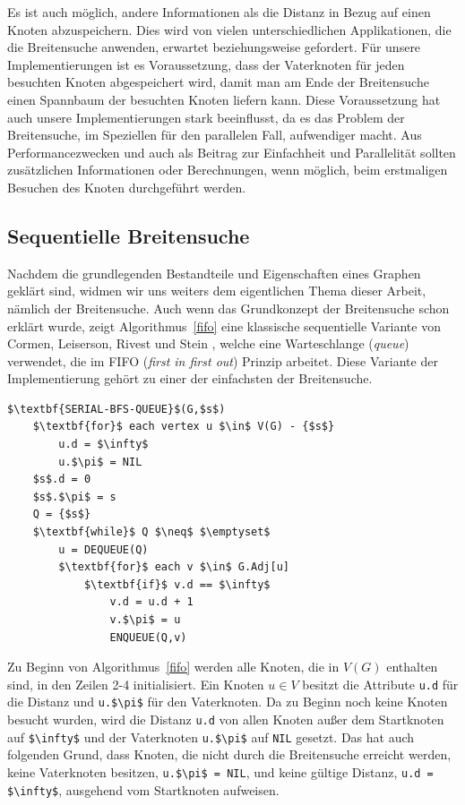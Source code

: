 \documentclass[11pt,a4paper]{article}
\begin{document}
Es ist auch möglich, andere Informationen als die Distanz in Bezug auf einen Knoten abzuspeichern. Dies wird von vielen unterschiedlichen Applikationen, die die Breitensuche anwenden, erwartet beziehungsweise gefordert. Für unsere Implementierungen ist es Voraussetzung, dass der Vaterknoten für jeden besuchten Knoten abgespeichert wird, damit man am Ende der Breitensuche einen Spannbaum der besuchten Knoten liefern kann. Diese Voraussetzung hat auch unsere Implementierungen stark beeinflusst, da es das Problem der Breitensuche, im Speziellen für den parallelen Fall, aufwendiger macht. Aus Performancezwecken und auch als Beitrag zur Einfachheit und Parallelität sollten zusätzlichen Informationen oder Berechnungen, wenn möglich, beim erstmaligen Besuchen des Knoten durchgeführt werden.
\subsection{Sequentielle Breitensuche}
Nachdem die grundlegenden Bestandteile und Eigenschaften eines Graphen geklärt sind, widmen wir uns weiters dem eigentlichen Thema dieser Arbeit, nämlich der Breitensuche. Auch wenn das Grundkonzept der Breitensuche schon erklärt wurde, zeigt Algorithmus~\ref{fifo} eine klassische sequentielle Variante von Cormen, Leiserson, Rivest und Stein \cite{cormen_introduction_2009}, welche eine Warteschlange (\textit{queue}) verwendet, die im FIFO (\textit{first in first out}) Prinzip arbeitet. Diese Variante der Implementierung gehört zu einer der einfachsten der Breitensuche.
\begin{lstlisting}[caption={Klassische Variante der Breitensuche unter Verwendung einer FIFO Warteschlange als Datenstruktur. Wird auf einem Graph \(G\) mit Startknoten \(s \in V(G)\) angewandt. Der Algorithmus bestimmt die Distanz und den Vaterknoten von denjenigen Knoten, die ausgehend vom Startknoten erreichbar sind.},label=fifo]
$\textbf{SERIAL-BFS-QUEUE}$(G,$s$)
	$\textbf{for}$ each vertex u $\in$ V(G) - {$s$}
		u.d = $\infty$
		u.$\pi$ = NIL
	$s$.d = 0
	$s$.$\pi$ = s
	Q = {$s$}
	$\textbf{while}$ Q $\neq$ $\emptyset$
		u = DEQUEUE(Q)
		$\textbf{for}$ each v $\in$ G.Adj[u]
			$\textbf{if}$ v.d == $\infty$
				v.d = u.d + 1
				v.$\pi$ = u
				ENQUEUE(Q,v)
\end{lstlisting}
Zu Beginn von Algorithmus~\ref{fifo} werden alle Knoten, die in \(V(G)\) enthalten sind, in den Zeilen 2-4 initialisiert. Ein Knoten \(u \in V\) besitzt die Attribute \lstinline{u.d} für die Distanz und \lstinline{u.$\pi$} für den Vaterknoten. Da zu Beginn noch keine Knoten besucht wurden, wird die Distanz \lstinline{u.d} von allen Knoten außer dem Startknoten auf \lstinline{$\infty$} und der Vaterknoten \lstinline{u.$\pi$} auf \lstinline{NIL} gesetzt. Das hat auch folgenden Grund, dass Knoten, die nicht durch die Breitensuche erreicht werden, keine Vaterknoten besitzen, \lstinline{u.$\pi$ = NIL}, und keine gültige Distanz, \lstinline{u.d = $\infty$}, ausgehend vom Startknoten aufweisen.\\
\end{document}
